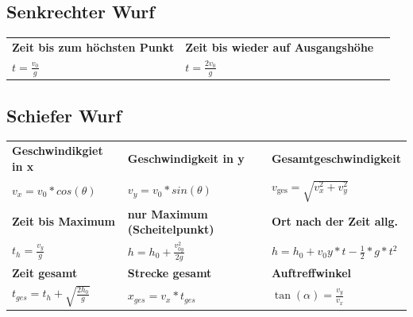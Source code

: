 \documentclass[10pt,a4paper]{article}
\begin{document}
		\subsection{Senkrechter Wurf}
		
		\begin{tabular}{p{} p{} p{}}
			
			\textbf{Zeit bis zum höchsten Punkt} &
			\textbf{Zeit bis wieder auf Ausgangshöhe} &
			\\[4pt]
			
			$t = \frac{v_0}{g}$ &
			$t = \frac{2 v_0}{g}$ &
			\\
			
		\end{tabular}
		
		\subsection{Schiefer Wurf}
		
		\begin{tabular}{p{} p{} p{}}
			
			\textbf{Geschwindikgiet in x} &
			\textbf{Geschwindigkeit in y} &
			\textbf{Gesamtgeschwindigkeit} \\[4pt]
			
			$v_x = v_0 * cos(\theta)$ &
			$v_y = v_0 * sin(\theta)$ &
			$v_{\text{ges}} = \sqrt{v_x^2 + v_y^2}$ \\[10pt]
			
			\textbf{Zeit bis Maximum} &
			\textbf{nur Maximum (Scheitelpunkt)} & 
            \textbf{Ort nach der Zeit allg.}\\[4pt]
			
			$t_h = \frac{v_y}{g}$ &
			$h=h_0+\frac{v_{0y}^2}{2g}$ &
            $h=h_0+v_0y*t-\frac{1}{2}*g*{t}^2$ \\[10pt]
            
            \textbf{Zeit gesamt} &
            \textbf{Strecke gesamt} & 
            \textbf{Auftreffwinkel} \\[4pt]
            
            $t_{ges} = t_h + \sqrt{\frac{2 h_0}{g}}$ &
            $x_{ges} = v_x*t_{ges}$ & 
            $\tan(\alpha) = \frac{v_y}{v_x}$ \\[10pt]
            
            
        \end{tabular}
        
\end{document}
